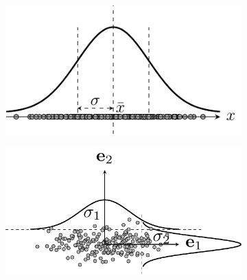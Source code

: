 \begin{figure}[t]
\begin{subfigure}{0.325\textwidth}
\includegraphics[width=0.99\linewidth]{Chapters/07_DimemsionalityReduction/27_pca/latex/var_1d.pdf}
\caption{}
\label{fig:27_2a}
\end{subfigure}
\begin{subfigure}{0.325\textwidth}
\includegraphics[width=0.99\linewidth]{Chapters/07_DimemsionalityReduction/27_pca/latex/pca_diagvar.pdf}
\caption{}
\label{fig:27_2b}
\end{subfigure}
\begin{subfigure}{0.325\textwidth}

\end{subfigure}
\end{figure}
